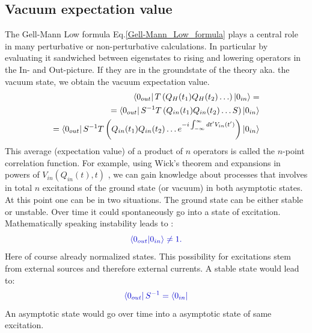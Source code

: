 \documentclass[12pt, titlepage]{article}
\begin{document}
\subsection{Vacuum expectation value} 
The Gell-Mann Low formula Eq.\enskip\eqref{Gell-Mann_Low_formula} plays a central role in many perturbative or non-perturbative calculations. In particular by evaluating it sandwiched between eigenstates to rising and lowering operators in the In- and Out-picture. If they are in the groundstate of the theory aka. the vacuum state, we obtain the vacuum expectation value.
\begin{subequations}
\begin{align}
\bra{0_{out}}
%
T
\left(
Q_{H}(t_1)
Q_{H}(t_2)
\ldots
\right)
%
\ket{0_{in}}=
\\
=
\bra{0_{out}}
S^{-1}
T\left( 
Q_{in}(t_{1})
Q_{in}(t_{2})
\ldots
S
\right)
\ket{0_{in}}
\\
=
\bra{0_{out}}
S^{-1}
T\left( 
Q_{in}(t_{1})
Q_{in}(t_{2})
\ldots
e^{-i\int^{\infty}_{-\infty}dt'V_{in}(t')}
\right)
\ket{0_{in}}
\end{align}
\end{subequations}%
This average (expectation value) of a product of $ n $ operators is called the $ n $-point correlation function. For example, using Wick's theorem and expansions in powers of $ V_{in}(Q_{in}(t),t) $ , we can gain knowledge about processes that involves in total $ n $ excitations of the ground state (or vacuum) in both asymptotic states.\\
At this point one can be in two situations. The ground state can be either stable or unstable. Over time it could spontaneously go into a state of excitation. Mathematically speaking instability leads to :
\begin{equation}\textcolor[RGB]{0,0,204}{
\braket{0_{out}|0_{in}}
\neq
1.
}
\end{equation}
Here of course already normalized states. This possibility for excitations stem from external sources and therefore external currents. A stable state would lead to:
\begin{equation}\textcolor[RGB]{0,0,204}{
\bra{0_{out}}
S^{-1}
=
\bra{0_{in}}
}
\end{equation}
An asymptotic state would go over time into a asymptotic state of same excitation.
%
%
% 
\newpage
\end{document}
